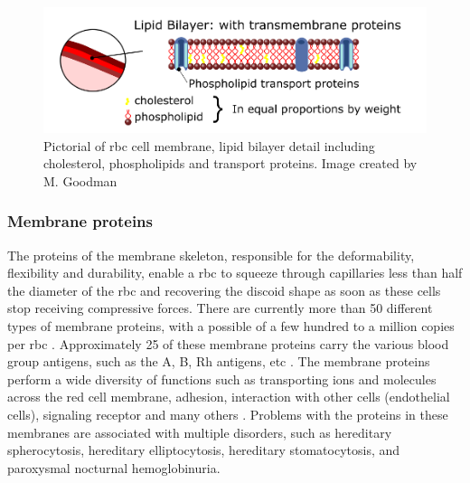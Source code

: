 \begin{figure}[H]
	\centering
	
	\includegraphics[width=0.8\linewidth]{fig/Lipidbylayer}
	
	\caption{Pictorial of \ac{rbc} cell membrane, lipid bilayer detail including cholesterol, phospholipids and transport proteins. Image created by M. Goodman }
	\label{fig.rbc.lipid}
\end{figure}


\subsubsection*{Membrane proteins}
\noindent The proteins of the membrane skeleton, responsible for the deformability, flexibility and durability, enable a \ac{rbc} to squeeze through capillaries less than half the diameter of the \ac{rbc} and recovering the discoid shape as soon as these cells stop receiving compressive forces. There are currently more than 50 different types of membrane proteins, with a possible of a few hundred to a million copies per \ac{rbc} \cite{redblood2009}. Approximately 25 of these membrane proteins carry the various blood group antigens, such as the A, B, Rh antigens, etc \cite{redblood2009}. The membrane proteins perform a wide diversity of functions such as transporting ions and molecules across the red cell membrane, adhesion, interaction with other cells (endothelial cells), signaling receptor and many others \cite{redblood2009}. Problems with the proteins in these membranes are associated with multiple disorders, such as hereditary spherocytosis, hereditary elliptocytosis, hereditary stomatocytosis, and paroxysmal nocturnal hemoglobinuria.


